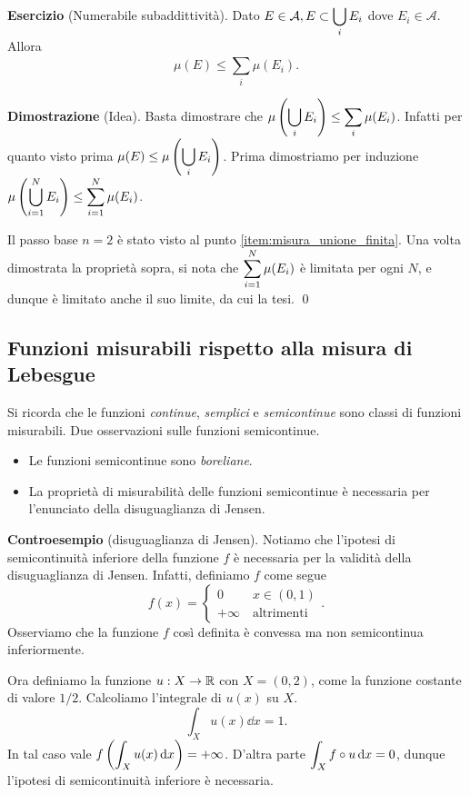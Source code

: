 \documentclass[a4paper, 12pt]{report}
\begin{document}
\textbf{Esercizio} (Numerabile subaddittività).
Dato $\displaystyle E \in \mathcal{A}, E \subset \bigcup_i E_i$ dove $E_i \in \mathcal{A}$. Allora
$$
	\mu(E) \leq \sum_{i}^{} \mu(E_i).
$$

\textbf{Dimostrazione} (Idea).
Basta dimostrare che $\displaystyle \mu \left( \bigcup_i E_i \right) \leq \sum_{i}^{} \mu(E_i)$. Infatti per quanto visto prima $\displaystyle \mu(E) \leq \mu \left( \bigcup_i E_i \right)$. Prima dimostriamo per induzione $\displaystyle \mu \left( \bigcup_{i = 1}^N E_i \right) \leq \sum_{i=1}^{N} \mu(E_i)$. 

Il passo base $n = 2$ è stato visto al punto \ref{item:misura_unione_finita}. Una volta dimostrata la proprietà sopra, si nota che $\displaystyle \sum_{i=1}^{N} \mu(E_i) $ è limitata per ogni $N$, e dunque è limitato anche il suo limite, da cui la tesi.
\qed

\subsection*{Funzioni misurabili rispetto alla misura di Lebesgue}

Si ricorda che le funzioni \textit{continue}, \textit{semplici} e \textit{semicontinue} sono classi di funzioni misurabili.
Due osservazioni sulle funzioni semicontinue.
\begin{itemize}
\item Le funzioni semicontinue sono \textit{boreliane}.

\item La proprietà di misurabilità delle funzioni semicontinue è necessaria per l'enunciato della disuguaglianza di Jensen.
\end{itemize}

\textbf{Controesempio} (disuguaglianza di Jensen).
Notiamo che l'ipotesi di semicontinuità inferiore della funzione $f$ è necessaria per la validità della disuguaglianza di Jensen.
Infatti, definiamo $f$ come segue
%
$$
f(x) = 
\begin{cases}
0 \qquad \; x \in (0,1) \\
+ \infty \quad \text{altrimenti} 
\end{cases}.
$$
%
Osserviamo che la funzione $f$ così definita è convessa ma non semicontinua inferiormente.

Ora definiamo la funzione $u : X \to \mathbb R$ con $X = (0,2)$, come la funzione costante di valore $1/2$.
Calcoliamo l'integrale di $u(x)$ su $X$.
%
$$
	\int_{X} u(x) \dd x = 1. 
$$
%
In tal caso vale $\displaystyle f \left( \int_X u(x) \,\mathrm{d} x \right) = + \infty$.
D'altra parte $\displaystyle \int_X f \circ u \,\mathrm{d} x = 0$, dunque l'ipotesi di semicontinuità inferiore è necessaria.
\end{document}
